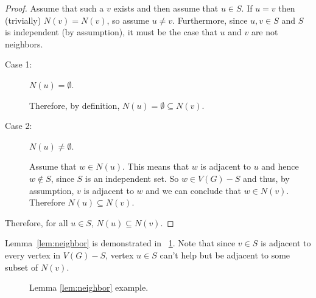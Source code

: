 \begin{proof}
  Assume that such a \(v\) exists and then assume that \(u\in S\).  If \(u=v\) then (trivially) \(N(v)=N(v)\), so
  assume \(u\ne v\).  Furthermore, since \(u,v\in S\) and \(S\) is independent (by assumption), it must be the case
  that \(u\) and \(v\) are not neighbors.

  \begin{description}
  \item[Case 1:] \(N(u)=\emptyset\).
      
    Therefore, by definition, \(N(u)=\emptyset\subseteq N(v)\).

  \item[Case 2:] \(N(u)\ne\emptyset\).

    Assume that \(w\in N(u)\).  This means that \(w\) is adjacent to \(u\) and hence \(w\notin S\), since \(S\) is
    an independent set.  So \(w\in V(G)-S\) and thus, by assumption, \(v\) is adjacent to \(w\) and we can conclude
    that \(w\in N(v)\).  Therefore \(N(u)\subseteq N(v)\).
  \end{description}

  Therefore, for all \(u\in S\), \(N(u)\subseteq N(v)\).
\end{proof}

Lemma~\ref{lem:neighbor} is demonstrated in \figurename~\ref{fig:neighbor}.  Note that since \(v\in S\) is adjacent
to every vertex in \(V(G)-S\), vertex \(u\in S\) can't help but be adjacent to some subset of \(N(v)\).

\begin{figure}[H]
  \centering
  \caption{Lemma \ref{lem:neighbor} example.}
  \label{fig:neighbor}
\end{figure}

